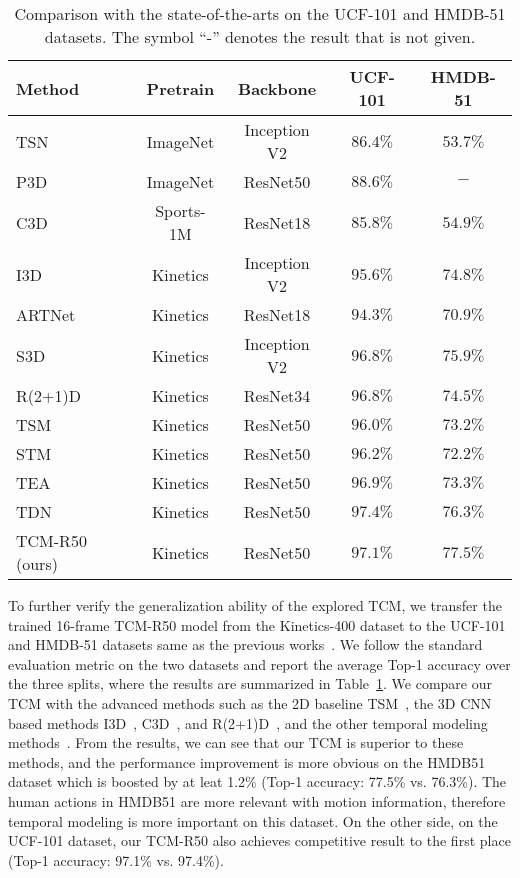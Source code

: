 \documentclass[journal]{IEEEtran}
\begin{document}
\setlength{\tabcolsep}{4.5pt}
\begin{table}
\caption{Comparison with the state-of-the-arts on the UCF-101 and HMDB-51 datasets. The symbol ``-” denotes the result that is not given.}
\label{tab:ucf-hmdb}
\centering
\begin{tabular}{l|c|c|c|c}
\hline
Method & Pretrain & Backbone & UCF-101 & HMDB-51 \\
\hline TSN~\cite{wang2016temporal} & ImageNet & Inception V2 & $86.4 \%$ & $53.7 \%$ \\
P3D~\cite{qiu2017learning} & ImageNet & ResNet50 & $88.6 \%$ & $-$ \\
C3D~\cite{tran2015learning} & Sports-1M & ResNet18 & $85.8 \%$ & $54.9 \%$ \\
I3D~\cite{carreira2017quo} & Kinetics & Inception V2 & $95.6 \%$ & $74.8 \%$ \\
ARTNet~\cite{wang2018appearance} & Kinetics & ResNet18 & $94.3 \%$ & $70.9 \%$ \\
S3D~\cite{xie2018rethinking} & Kinetics & Inception V2 & $96.8 \%$ & $75.9 \%$ \\
R(2+1)D~\cite{tran2018closer} & Kinetics & ResNet34 & $96.8 \%$ & $74.5 \%$ \\
TSM~\cite{lin2019tsm} & Kinetics & ResNet50 & $96.0 \%$ & $73.2 \%$ \\
STM~\cite{jiang2019stm} & Kinetics & ResNet50 & $96.2 \%$ & $72.2 \%$ \\
TEA~\cite{li2020tea} & Kinetics & ResNet50 & $96.9 \%$ & $73.3 \%$ \\
TDN~\cite{wang2021tdn} & Kinetics & ResNet50 & $\mathbf{97.4\%}$ & $76.3\%$ \\ \hline
TCM-R50 (ours) & Kinetics & ResNet50 & $\mathbf{97.1\%}$ & $\mathbf{77.5\%}$ \\
\hline
\end{tabular}
\end{table}

To further verify the generalization ability of the explored TCM, we transfer the trained 16-frame TCM-R50 model from the Kinetics-400 dataset to the UCF-101 and HMDB-51 datasets same as the previous works~\cite{lin2019tsm, li2020tea, wang2021tdn}. We follow the standard evaluation metric on the two datasets and report the average Top-1 accuracy over the three splits, where the results are summarized in Table~\ref{tab:ucf-hmdb}. We compare our TCM with the advanced methods such as the 2D baseline TSM~\cite{lin2019tsm}, the 3D CNN based methods I3D~\cite{carreira2017quo}, C3D~\cite{tran2015learning}, and R(2+1)D~\cite{tran2018closer}, and the other temporal modeling methods~\cite{jiang2019stm,li2020tea,wang2021tdn}. From the results, we can see that our TCM is superior to these methods, and the performance improvement is more obvious on the HMDB51 dataset which is boosted by at leat 1.2\% (Top-1 accuracy: 77.5\% vs. 76.3\%). The human actions in HMDB51 are more relevant with motion information, therefore temporal modeling is more important on this dataset. On the other side, on the UCF-101 dataset, our TCM-R50 also achieves competitive result to the first place (Top-1 accuracy: 97.1\% vs. 97.4\%).
\end{document}
